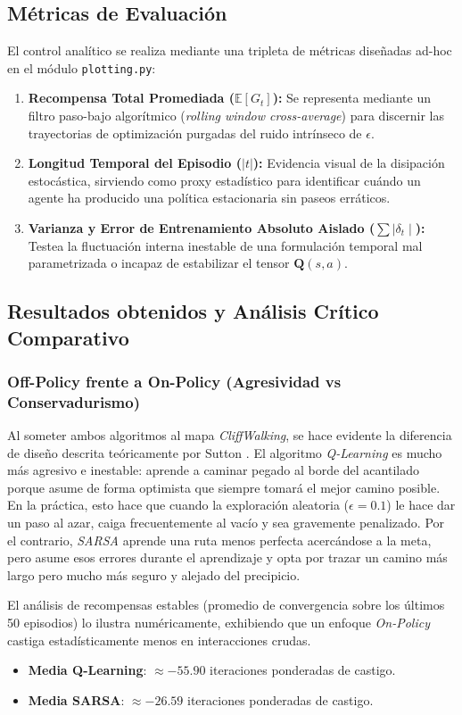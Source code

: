 \subsection{Métricas de Evaluación}
El control analítico se realiza mediante una tripleta de métricas diseñadas ad-hoc en el módulo \texttt{plotting.py}:
\begin{enumerate}
    \item \textbf{Recompensa Total Promediada ($ \mathbb{E}[G_t] $):} Se representa mediante un filtro paso-bajo algorítmico (\textit{rolling window cross-average}) para discernir las trayectorias de optimización purgadas del ruido intrínseco de $\epsilon$.
    \item \textbf{Longitud Temporal del Episodio ($|t|$):} Evidencia visual de la disipación estocástica, sirviendo como proxy estadístico para identificar cuándo un agente ha producido una política estacionaria sin paseos erráticos.
    \item \textbf{Varianza y Error de Entrenamiento Absoluto Aislado ($ \sum \mid\delta_t\mid $):} Testea la fluctuación interna inestable de una formulación temporal mal parametrizada o incapaz de estabilizar el tensor $\mathbf{Q}(s,a)$.
\end{enumerate}

\subsection{Resultados obtenidos y Análisis Crítico Comparativo}

\subsubsection{Off-Policy frente a On-Policy (Agresividad vs Conservadurismo)}
Al someter ambos algoritmos al mapa \textit{CliffWalking}, se hace evidente la diferencia de diseño descrita teóricamente por Sutton \cite{Sutton1998}. El algoritmo \textit{Q-Learning} es mucho más agresivo e inestable: aprende a caminar pegado al borde del acantilado porque asume de forma optimista que siempre tomará el mejor camino posible. En la práctica, esto hace que cuando la exploración aleatoria ($\epsilon=0.1$) le hace dar un paso al azar, caiga frecuentemente al vacío y sea gravemente penalizado.
Por el contrario, \textit{SARSA} aprende una ruta menos perfecta acercándose a la meta, pero asume esos errores durante el aprendizaje y opta por trazar un camino más largo pero mucho más seguro y alejado del precipicio.

El análisis de recompensas estables (promedio de convergencia sobre los últimos 50 episodios) lo ilustra numéricamente, exhibiendo que un enfoque \textit{On-Policy} castiga estadísticamente menos en interacciones crudas.
\begin{itemize}
    \item \textbf{Media Q-Learning}: $\approx -55.90$ iteraciones ponderadas de castigo.
    \item \textbf{Media SARSA}: $\approx -26.59$ iteraciones ponderadas de castigo.
\end{itemize}

